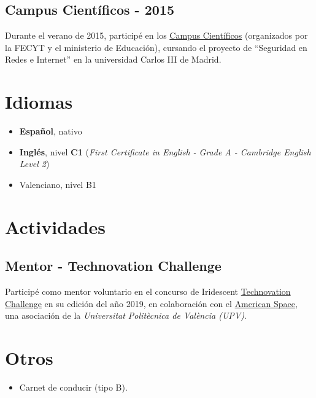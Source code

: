 \documentclass[letterpaper, 12pt, dvipsnames]{article}
\newcommand{\uni}{{\uniFull} ({\uniShort})}
\newcommand{\uniFull}{Universitat Politècnica de València}
\newcommand{\uniShort}{UPV}
\newcommand{\fce}{\emph{First Certificate in English - Grade A - Cambridge English Level 2}}
\begin{document}
\subsection{Campus Científicos - 2015}

Durante el verano de 2015, participé en los \href{https://www.campuscientificos.es/}{Campus Científicos} (organizados por la FECYT y el ministerio de Educación), cursando el proyecto de ``Seguridad en Redes e Internet'' en la universidad Carlos III de Madrid.

\section{Idiomas}

\begin{itemize}
    \item \textbf{Español}, nativo
    \item \textbf{Inglés}, nivel \textbf{C1} (\fce)
    \item Valenciano, nivel B1
\end{itemize}

\section{Actividades}

\subsection{Mentor - Technovation Challenge}

Participé como mentor voluntario en el concurso de Iridescent \href{https://technovationchallenge.org/}{Technovation Challenge} en su edición del año 2019, en colaboración con el \href{https://cdl.upv.es/american-space}{American Space}, una asociación de la \emph{\uni}.

\section{Otros}

\begin{itemize}
    \item Carnet de conducir (tipo B).
\end{itemize}
\end{document}
